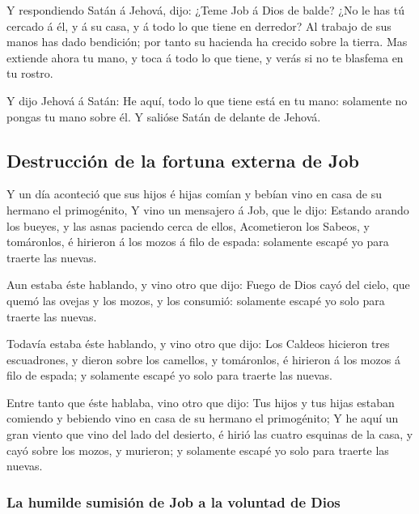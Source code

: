  Y respondiendo Satán á Jehová, dijo: ¿Teme Job á Dios de
balde?  ¿No le has tú cercado á él, y á su casa, y á todo
lo que tiene en derredor? Al trabajo de sus manos has dado bendición;
por tanto su hacienda ha crecido sobre la tierra.  Mas
extiende ahora tu mano, y toca á todo lo que tiene, y verás si no te
blasfema en tu rostro.

 Y dijo Jehová á Satán: He aquí, todo lo que tiene está en
tu mano: solamente no pongas tu mano sobre él. Y salióse Satán de
delante de Jehová.

\hypertarget{destrucciuxf3n-de-la-fortuna-externa-de-job}{%
\subsection{Destrucción de la fortuna externa de
Job}\label{destrucciuxf3n-de-la-fortuna-externa-de-job}}

 Y un día aconteció que sus hijos é hijas comían y bebían
vino en casa de su hermano el primogénito,  Y vino un
mensajero á Job, que le dijo: Estando arando los bueyes, y las asnas
paciendo cerca de ellos,  Acometieron los Sabeos, y
tomáronlos, é hirieron á los mozos á filo de espada: solamente escapé yo
para traerte las nuevas.

 Aun estaba éste hablando, y vino otro que dijo: Fuego de
Dios cayó del cielo, que quemó las ovejas y los mozos, y los consumió:
solamente escapé yo solo para traerte las nuevas.

 Todavía estaba éste hablando, y vino otro que dijo: Los
Caldeos hicieron tres escuadrones, y dieron sobre los camellos, y
tomáronlos, é hirieron á los mozos á filo de espada; y solamente escapé
yo solo para traerte las nuevas.

 Entre tanto que éste hablaba, vino otro que dijo: Tus
hijos y tus hijas estaban comiendo y bebiendo vino en casa de su hermano
el primogénito;  Y he aquí un gran viento que vino del lado
del desierto, é hirió las cuatro esquinas de la casa, y cayó sobre los
mozos, y murieron; y solamente escapé yo solo para traerte las nuevas.

\hypertarget{la-humilde-sumisiuxf3n-de-job-a-la-voluntad-de-dios}{%
\subsubsection{La humilde sumisión de Job a la voluntad de
Dios}\label{la-humilde-sumisiuxf3n-de-job-a-la-voluntad-de-dios}}

